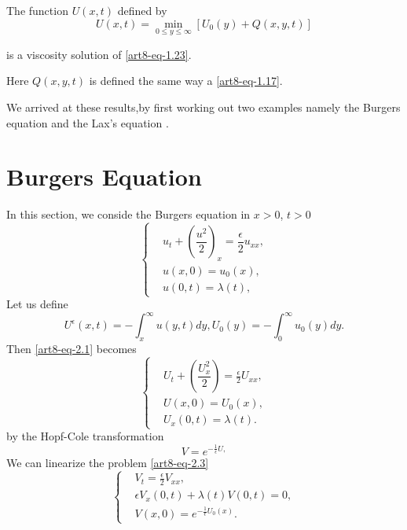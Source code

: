 \begin{theorem}\label{art8-thm-3}
The function $U(x, t)$ defined by
\begin{equation}\label{art8-eq-1.24}
U(x,t)= \min\limits_{0 \leq y \leq \infty}[U_{0}(y) + Q(x, y,t)]
\end{equation}
\end{theorem}
 is a viscosity solution of \eqref{art8-eq-1.23}.

Here $Q(x,y,t)$ is defined the same way a \eqref{art8-eq-1.17}.

We arrived at these results,by first working out two examples namely the Burgers equation \cite{art8-key3} and the Lax's equation \cite{art8-key4}.

\section{Burgers Equation}\label{art8-sec-2}
In this section, we conside the Burgers equation in $x > 0$, $t>0$
\begin{equation}\label{art8-eq-2.1}
\left\{
\begin{aligned}
&u_{t} + \left(\dfrac{u^{2}}{2}\right)_{x} = \dfrac{\epsilon}{2}u_{xx},\\
&u(x,0)=u_{0}(x),\\
&u(0,t) = \lambda(t),
\end{aligned}
\right.
\end{equation}
Let us define
\begin{equation}\label{art8-eq-2.2}
U^{\epsilon}(x,t) = -\int_{x}^{\infty} u(y,t)dy, U_{0}(y) = -\int_{0}^{\infty} u_{0}(y)dy.
\end{equation}
Then \eqref{art8-eq-2.1} becomes
\begin{equation}\label{art8-eq-2.3}
\left\{
\begin{aligned}
&U_{t}+\left(\dfrac{U_{x}^{2}}{2}\right) =\tfrac{\epsilon}{2}U_{xx},\\
&U(x, 0)=U_{0}(x),\\
&U_{x}(0,t)= \lambda(t).
\end{aligned}
\right.
\end{equation}
by the Hopf-Cole transformation
\begin{equation}\label{art8-eq-2.4}
V=e^{-\tfrac{1}{\epsilon}U,}
\end{equation}
We can linearize the problem \eqref{art8-eq-2.3}
\begin{equation}\label{art8-eq-2.5}
\left\{
\begin{aligned}
&V_{t} =\tfrac{\epsilon}{2}V_{xx},\\
&\epsilon V_{x}(0, t)+\lambda(t) V(0,t) = 0,\\
&V(x,0)= e^{-\frac{1}{\epsilon}U_{0}(x)}.
\end{aligned}
\right.
\end{equation}
